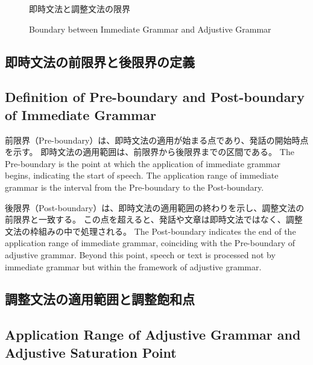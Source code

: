 \documentclass[a4paper,xelatex,ja=standard]{bxjsarticle}
\begin{document}
\begin{figure}[htb]
\ifJPN
\caption{即時文法と調整文法の限界}\label{fig:boundary-j}
\else
\caption{Boundary between Immediate Grammar and Adjustive Grammar}\label{fig:boundary}
\fi
\end{figure}



\ifJPN
\subsection{即時文法の前限界と後限界の定義}
\else
\subsection{Definition of Pre-boundary and Post-boundary of Immediate Grammar}
\fi

\ifJPN
前限界（Pre-boundary）は、即時文法の適用が始まる点であり、発話の開始時点を示す。  
即時文法の適用範囲は、前限界から後限界までの区間である。  
\else
The Pre-boundary is the point at which the application of immediate grammar begins, indicating the start of speech.
The application range of immediate grammar is the interval from the Pre-boundary to the Post-boundary.
\fi

\ifJPN
後限界（Post-boundary）は、即時文法の適用範囲の終わりを示し、調整文法の前限界と一致する。  
この点を超えると、発話や文章は即時文法ではなく、調整文法の枠組みの中で処理される。  
\else
The Post-boundary indicates the end of the application range of immediate grammar, coinciding with the Pre-boundary of adjustive grammar.
Beyond this point, speech or text is processed not by immediate grammar but within the framework of adjustive grammar.
\fi

\ifJPN
\subsection{調整文法の適用範囲と調整飽和点}
\else
\subsection{Application Range of Adjustive Grammar and Adjustive Saturation Point}
\fi
\end{document}
